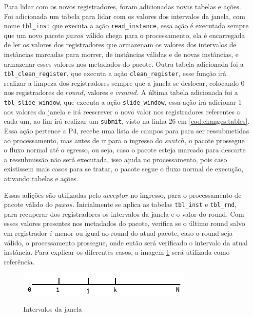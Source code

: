 \documentclass[12pt,
openright, 
oneside,
a4paper,
brazil]{facom-ufu-abntex2}
\theoremstyle{definition}
\begin{document}


Para lidar com os novos registradores, foram adicionadas novas tabelas e ações. Foi adicionada um tabela para lidar com os
valores dos intervalos da janela, com nome \texttt{tbl\_inst} que executa a ação \texttt{read\_instance}, essa ação é executada
sempre que um novo pacote $paxos$ válido chega para o processamento, ela é encarregada de ler os valores dos registradores
que armazenam os valores dos intervalos de instâncias marcadas para morrer, de instâncias válidas e de novas instâncias, 
e armazenar esses valores nos metadados do pacote. Outra tabela adicionada foi a \texttt{tbl\_clean\_register}, que executa
a ação \texttt{clean\_register}, esse função irá realizar a limpeza dos registradores sempre que a janela se deslocar, colocando
0 nos registradores de $round$, valores e $vround$. A última tabela adicionada foi a \texttt{tbl\_slide\_window}, que executa a
ação \texttt{slide\_window}, essa ação irá adicionar 1 aos valores da janela e irá reescrever o novo valor nos registradores referentes
a cada um, ao fim irá realizar um \texttt{submit}, visto na linha 26 em \ref{cod:changes:tables}. Essa ação pertence a P4, recebe uma
lista de campos para para ser ressubmetidas ao processamento, mas antes de ir para o ingresso do $switch$, o pacote prossegue o
fluxo normal até o egresso, ou seja, caso o pacote esteja marcado para descarte a ressubmissão não será executada, isso ajuda
no processamento, pois caso existissem mais casos para se tratar, o pacote segue o fluxo normal de execução, ativando
tabelas e ações.

Essas adições são utilizadas pelo $acceptor$ no ingresso, para o processamento de pacote válido do $paxos$. Inicialmente se
aplica as tabelas \texttt{tbl\_inst} e \texttt{tbl\_rnd}, para recuperar dos registradores os intervalos da janela e o valor 
do round. Com esses valores presentes nos metadados do pacote, verifica se o último round salvo em registrador é menor
ou igual ao round do atual pacote, caso o round seja válido, o processamento prossegue, onde então será verificado o intervalo
da atual instância. Para explicar os diferentes casos, a imagem \ref{fig:window-intervals} será utilizada como referência.

\begin{figure}[h]
    \caption{Intervalos da janela}
    \centering
    \includegraphics[scale=0.8]{images/window.png}
    \label{fig:window-intervals}
\end{figure}
\end{document}
